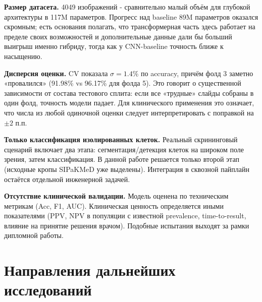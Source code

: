 \documentclass[14pt,a4paper]{extreport}
\begin{document}
\textbf{Размер датасета.} 4049 изображений - сравнительно малый объём
для глубокой архитектуры в 117M параметров. Прогресс над baseline 89M
параметров оказался скромным; есть основания полагать, что
трансформерная часть здесь работает на пределе своих возможностей и
дополнительные данные дали бы больший выигрыш именно гибриду, тогда как
у CNN-baseline точность ближе к насыщению.

\textbf{Дисперсия оценки.} CV показала $\sigma = 1.4$\% по accuracy,
причём фолд 3 заметно «провалился» (91.98\% vs 96.17\% для фолда 5).
Это говорит о существенной зависимости от состава тестового сплита:
если все «трудные» слайды собраны в один фолд, точность модели падает.
Для клинического применения это означает, что числа из любой одиночной
оценки следует интерпретировать с поправкой на $\pm 2$ п.п.

\textbf{Только классификация изолированных клеток.} Реальный
скрининговый сценарий включает два этапа: сегментация/детекция клеток
на широком поле зрения, затем классификация. В данной работе решается
только второй этап (исходные кропы SIPaKMeD уже выделены). Интеграция в
сквозной пайплайн остаётся отдельной инженерной задачей.

\textbf{Отсутствие клинической валидации.} Модель оценена по техническим
метрикам (Acc, F1, AUC). Клиническая ценность определяется иными
показателями (PPV, NPV в популяции с известной prevalence, time-to-result,
влияние на принятие решения врачом). Подобные испытания выходят за рамки
дипломной работы.

\section{Направления дальнейших исследований}
\end{document}
